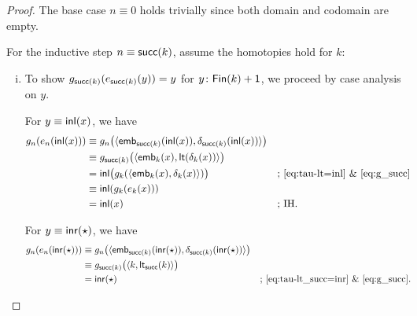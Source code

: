 \begin{proof}
    The base case $n\equiv0$ holds trivially since both domain and codomain are empty.
    
    For the inductive step $n\equiv\mathsf{succ}(k)$, assume the homotopies hold for $k$:
    \begin{enumerate}[i)]
        \item To show $g_{\mathsf{succ}(k)}(e_{\mathsf{succ}(k)}(y))=y$ for $y\colon\fun{Fin}(k)+\fun1$, we proceed by case analysis on $y$.
        
        For $y\equiv\mathsf{inl}(x)$, we have
        \begin{align*}
            g_n(
                e_n(\mathsf{inl}(x))
            )
                &\equiv g_n\bigl(
                    \langle
                        \mathsf{emb}_{\mathsf{succ}(k)}(
                            \mathsf{inl}(x)
                        ),
                        \delta_{\mathsf{succ}(k)}(
                            \mathsf{inl}(x)
                        )
                    \rangle
                \bigr)\\
                &\equiv g_{\mathsf{succ}(k)}\bigl(
                    \langle
                        \mathsf{emb}_k(x),
                        \mathsf{lt}(\delta_k(x))
                    \rangle
                \bigr)\\
                &=\mathsf{inl}\bigl(
                    g_k(\langle\mathsf{emb}_k(x),\delta_k(x)\rangle)
                \bigr)
                    &&\text{; \eqref{eq:tau-lt=inl} \& \eqref{eq:g_succ}}\\
                &\equiv\mathsf{inl}(g_k(e_k(x)))\\
                &=\mathsf{inl}(x)
                    &&\text{; IH.}
        \end{align*}
        
        For $y\equiv\mathsf{inr}({\mathsf{\star}})$, we have
        \begin{align*}
            g_n(e_n(\mathsf{inr}({\mathsf{\star}})))
                &\equiv g_n\bigl(
                    \langle
                        \mathsf{emb}_{\mathsf{succ}(k)}(
                            \mathsf{inr}({\mathsf{\star}})
                        ),
                        \delta_{\mathsf{succ}(k)}(
                            \mathsf{inr}({\mathsf{\star}})
                        )
                    \rangle
                \bigr)\\
                &\equiv g_{\mathsf{succ}(k)}\bigl(
                    \langle
                        k,
                        \mathsf{lt}_{\mathsf{succ}}(k)
                    \rangle
                \bigr)\\
                &=\mathsf{inr}({\mathsf{\star}})
                    &&\text{; \eqref{eq:tau-lt_succ=inr} \& \eqref{eq:g_succ}.}
        \end{align*}
        

\end{enumerate}
\end{proof}
